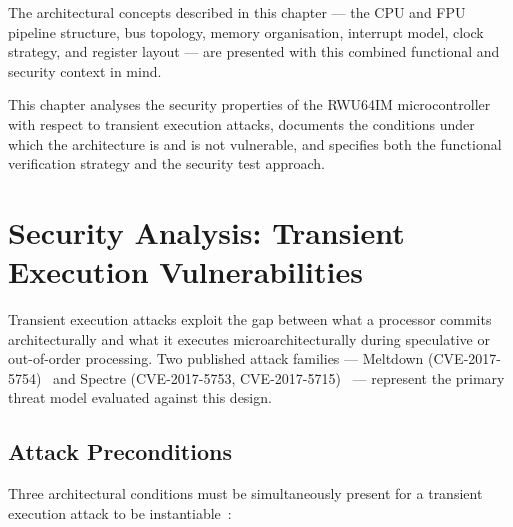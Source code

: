 The architectural concepts described in this chapter — the CPU and FPU pipeline
structure, bus topology, memory organisation, interrupt model, clock strategy, and
register layout — are presented with this combined functional and security context
in mind.


%

\label{chap:testdebug}

This chapter analyses the security properties of the RWU64IM microcontroller with
respect to transient execution attacks, documents the conditions under which the
architecture is and is not vulnerable, and specifies both the functional verification
strategy and the security test approach.

\section{Security Analysis: Transient Execution Vulnerabilities}

Transient execution attacks exploit the gap between what a processor commits
architecturally and what it executes microarchitecturally during speculative or
out-of-order processing.  Two published attack families — Meltdown
(CVE-2017-5754)~\cite{lipp2018meltdown} and Spectre
(CVE-2017-5753, CVE-2017-5715)~\cite{kocher2019spectre} — represent the primary
threat model evaluated against this design.

\subsection{Attack Preconditions}

Three architectural conditions must be simultaneously present for a transient
execution attack to be instantiable~\cite{kocher2019spectre,lipp2018meltdown}:

